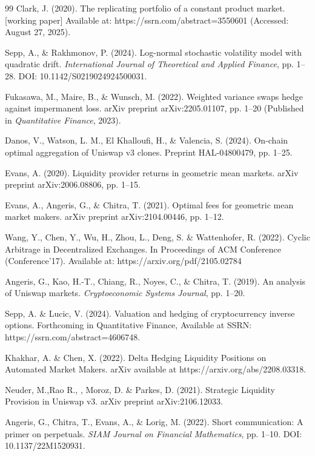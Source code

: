 \documentclass{article}
\begin{document}
\begin{thebibliography}{99}
Clark, J. (2020).
The replicating portfolio of a constant product market.[working paper] Available at: https://ssrn.com/abstract=3550601 (Accessed: August 27, 2025).

Sepp, A., \& Rakhmonov, P. (2024). Log-normal stochastic volatility model with quadratic drift. \textit{International Journal of Theoretical and Applied Finance}, pp. 1--28. DOI: 10.1142/S0219024924500031.

Fukasawa, M., Maire, B., \& Wunsch, M. (2022). Weighted variance swaps hedge against impermanent loss. arXiv preprint arXiv:2205.01107, pp. 1--20 (Published in \textit{Quantitative Finance}, 2023).

Danos, V., Watson, L. M., El Khalloufi, H., \& Valencia, S. (2024). On-chain optimal aggregation of Uniswap v3 clones. Preprint HAL-04800479, pp. 1--25.

Evans, A. (2020). Liquidity provider returns in geometric mean markets. arXiv preprint arXiv:2006.08806, pp. 1--15.

Evans, A., Angeris, G., \& Chitra, T. (2021). Optimal fees for geometric mean market makers. arXiv preprint arXiv:2104.00446, pp. 1--12.

Wang, Y., Chen, Y., Wu, H., Zhou, L., Deng, S.
\& Wattenhofer, R. (2022). Cyclic Arbitrage in Decentralized
Exchanges. In Proceedings of ACM Conference (Conference’17). Available at: https://arxiv.org/pdf/2105.02784


Angeris, G., Kao, H.-T., Chiang, R., Noyes, C., \& Chitra, T. (2019). An analysis of Uniswap markets. \textit{Cryptoeconomic Systems Journal}, pp. 1--20.

Sepp, A. \& Lucic, V. (2024). Valuation and hedging of cryptocurrency inverse options. Forthcoming in Quantitative Finance, Available at SSRN: https://ssrn.com/abstract=4606748. 


Khakhar, A. \& Chen, X. (2022). Delta Hedging Liquidity Positions on Automated Market Makers. arXiv available at https://arxiv.org/abs/2208.03318.

Neuder, M.,Rao  R., , Moroz, D. \& Parkes, D. (2021). Strategic
Liquidity Provision in Uniswap v3. arXiv preprint arXiv:2106.12033.

Angeris, G., Chitra, T., Evans, A., \& Lorig, M. (2022). Short communication: A primer on perpetuals. \textit{SIAM Journal on Financial Mathematics}, pp. 1--10. DOI: 10.1137/22M1520931.


\end{thebibliography}
\end{document}
